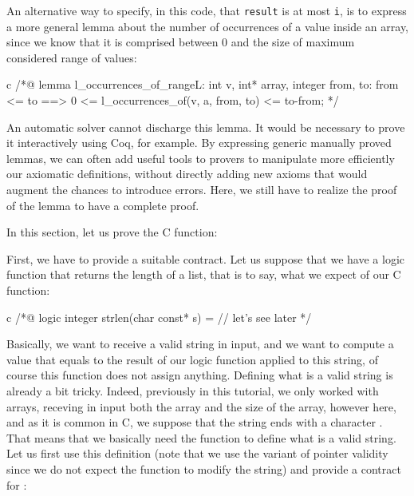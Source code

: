 


An alternative way to specify, in this code, that \texttt{result} is at
most \texttt{i}, is to express a more general lemma about the number of
occurrences of a value inside an array, since we know that it is
comprised between 0 and the size of maximum considered range of values:



\begin{CodeBlock}{c}
/*@
lemma l_occurrences_of_range{L}:
  \forall int v, int* array, integer from, to:
    from <= to ==> 0 <= l_occurrences_of(v, a, from, to) <= to-from;
*/
\end{CodeBlock}



An automatic solver cannot discharge this lemma. It would be necessary
to prove it interactively using Coq, for example. By expressing generic
manually proved lemmas, we can often add useful tools to provers to
manipulate more efficiently our axiomatic definitions, without directly
adding new axioms that would augment the chances to introduce errors.
Here, we still have to realize the proof of the lemma to have a complete
proof.




In this section, let us prove the C  function:




First, we have to provide a suitable contract. Let us suppose that we
have a logic function  that returns the length of a
list, that is to say, what we expect of our C function:


\begin{CodeBlock}{c}
/*@
  logic integer strlen(char const* s) = // let's see later 
*/
\end{CodeBlock}



Basically, we want to receive a valid string in input, and we want to
compute a value that equals to the result of our logic function
 applied to this string, of course this function
does not assign anything. Defining what is a valid string is already
a bit tricky. Indeed, previously in this tutorial, we only worked with
arrays, receving in input both the array and the size of the array,
however here, and as it is common in C, we suppose that the string ends
with a character . That means that we
basically need the  function to define what is a
valid string. Let us first use this definition (note that we use the
 variant of pointer validity
since we do not expect the function to modify the string) and provide
a contract for :



